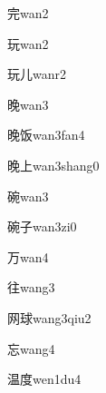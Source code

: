 \begin{verbete}[7]{完}{wan2}
\end{verbete}

\begin{verbete}[8]{玩}{wan2}
\end{verbete}

\begin{verbete}[8;2]{玩儿}{wanr2}
\end{verbete}

\begin{verbete}[11]{晚}{wan3}
\end{verbete}

\begin{verbete}[11;7]{晚饭}{wan3fan4}
\end{verbete}

\begin{verbete}[11;3]{晚上}{wan3shang0}
\end{verbete}

\begin{verbete}[13]{碗}{wan3}
\end{verbete}

\begin{verbete}[13;3]{碗子}{wan3zi0}
\end{verbete}

\begin{verbete}[3]{万}{wan4}
\end{verbete}

\begin{verbete}[8]{往}{wang3}
\end{verbete}

\begin{verbete}[6;11]{网球}{wang3qiu2}
\end{verbete}

\begin{verbete}[7]{忘}{wang4}
\end{verbete}

\begin{verbete}[12;9]{温度}{wen1du4}
\end{verbete}

